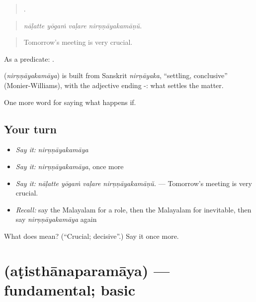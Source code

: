 \begin{quote}
   .
\end{quote}

\begin{quote}
\emph{nāḷatte yōgaṁ vaḷare nirṇṇāyakamāṇŭ.}
\end{quote}

\begin{quote}
Tomorrow's meeting is very crucial.
\end{quote}

As a predicate: .

\begin{cousinweb}
\textbf{} (\emph{nirṇṇāyakamāya}) is built from Sanskrit \emph{nirṇāyaka}, \textquotedblleft{}settling, conclusive\textquotedblright{} (Monier-Williams), with the adjective ending -: what settles the matter.
\end{cousinweb}

\begin{grammarlens}[title={What you've built}]
One more word for saying what happens if.
\end{grammarlens}

\subsection*{Your turn}
\begin{itemize}
\raggedright
  \item \emph{Say it:} \emph{nirṇṇāyakamāya}
  \item \emph{Say it:} \emph{nirṇṇāyakamāya}, once more
  \item \emph{Say it:} \emph{nāḷatte yōgaṁ vaḷare nirṇṇāyakamāṇŭ.} — Tomorrow's meeting is very crucial.
  \item \emph{Recall:} say the Malayalam for a role, then the Malayalam for inevitable, then say \emph{nirṇṇāyakamāya} again
\end{itemize}

\begin{tcolorbox}[breakable,colback=teal!4,colframe=teal!35!black,title={Before you move on}]
What does  mean? (\textquotedblleft{}Crucial; decisive\textquotedblright{}.) Say it once more.
\end{tcolorbox}
\section[\texorpdfstring{\ml{അടിസ്ഥാനപരമായ} (aṭisthānaparamāya)}{അടിസ്ഥാനപരമായ (aṭisthānaparamāya)}]{ (aṭisthānaparamāya) — fundamental; basic}

